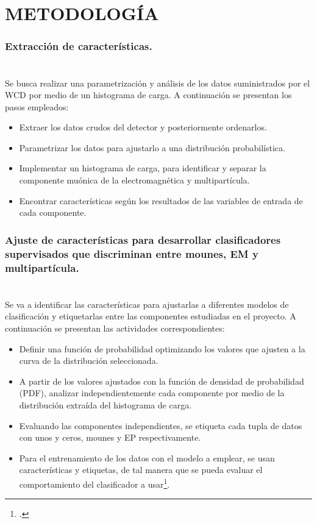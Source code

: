 \chapter{\MakeUppercase{Metodología}}
\label{ch:e_lento}


\subsection{Extracción de características. \\ \\}

Se busca realizar una parametrización y análisis de los datos suministrados por el WCD por medio de un histograma de carga. A continuación se presentan los pasos empleados:

\begin{itemize}
    \item Extraer los datos crudos del detector y posteriormente ordenarlos.
     \item Parametrizar los datos para ajustarlo a una distribución probabilística.
     \item Implementar un histograma de carga, para identificar y separar la componente muónica de la electromagnética y multipartícula.
     \item Encontrar características según los resultados de las variables de entrada de cada componente.
 \end{itemize}
 

\subsection{Ajuste de características para desarrollar clasificadores supervisados que discriminan entre mounes, EM y multipartícula. \\ \\}

Se va a identificar las características para ajustarlas a diferentes modelos de clasificación y etiquetarlas entre las componentes estudiadas en el proyecto. A continuación se presentan las actividades correspondientes:
\begin{itemize}
    \item Definir una función de probabilidad optimizando los valores que ajusten a la curva de la distribución seleccionada.
    \item A partir de los valores ajustados con la función de densidad de probabilidad (PDF), analizar independientemente cada componente por medio de la distribución extraída del histograma de carga.
    \item Evaluando las componentes independientes, se etiqueta cada tupla de datos con unos y ceros, mounes y EP respectivamente.
    \item Para el entrenamiento de los datos con el modelo a emplear, se usan características y etiquetas, de tal manera que se pueda evaluar el comportamiento del clasificador a usar\footcite{perez2005modelos}.
\end{itemize}


